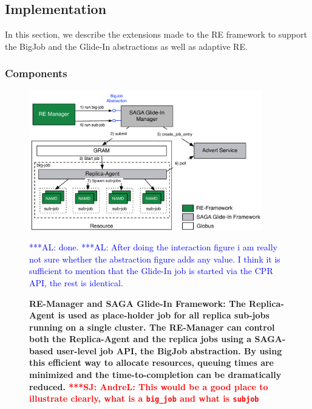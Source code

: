 \documentclass{rspublic}
\newcommand{\alnote}[1]{ {\textcolor{blue} { ***AL: #1 }}}
\newcommand{\jhanote}[1]{ {\textcolor{red} { ***SJ: #1 }}}
\newcommand{\alnote}[1]{}
\newcommand{\jhanote}[1]{}
\newcommand{\replicaagent}[1]{Replica-Agent }
\newcommand{\remanager}[1]{RE-Manager }
\begin{document}
         
\subsection{Implementation}

In this section, we describe the extensions made to the RE framework
to support the BigJob and the Glide-In abstractions as well as adaptive
RE.

\subsubsection{Components}     

\begin{figure}[t]
    \centering
    \includegraphics[width=0.9\textwidth]{re_bigjob_interactions}   
    \caption{\footnotesize \bf RE-Manager and SAGA Glide-In Framework:
      The Replica-Agent is used as place-holder job for all replica
      sub-jobs running on a single cluster. The \remanager\ can
      control both the \replicaagent\ and the replica jobs using a
      SAGA-based user-level job API, the BigJob abstraction. By using
      this efficient way to allocate resources, queuing times are
      minimized and the time-to-completion can be dramatically
      reduced. \jhanote{AndreL: This would be a good place to
        illustrate clearly, what is a \texttt{big\_job} and what is
        \texttt{sub\-job}}} \alnote{done.} \alnote{After doing the
      interaction figure i am really not sure whether the abstraction
      figure adds any value. I think it is sufficient to mention that
      the Glide-In job is started via the CPR API, the rest is
      identical.}
    \label{fig:remdmanager_v1.1}
\end{figure}
    
\end{document}
